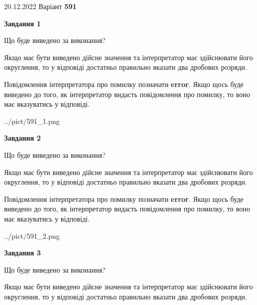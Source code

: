 \documentclass[12pt, ukrainian]{article}
\begin{document}
{20.12.2022 Варіант \No \textbf { 591 }\par}
{
\begin {Large}

{\begin {center}\textbf{Завдання 1}\end {center}}\par
Що буде виведено за виконання? \par

Якщо має бути виведено дійсне значення та інтерпретатор має здійснювати його округлення, 
то у відповіді достатньо правильно вказати два дробових розряди.

Повідомлення інтерпретатора про помилку позначати \textbf{error}.
Якщо щось буде виведено до того, як інтерпретатор видасть повідомлення про помилку, 
то воно має вказуватись у відповіді. \par

\begin{center}
	{../pict/591_1.png}
\end{center}
\newpage

{\begin {center}\textbf{Завдання 2}\end {center}}\par
Що буде виведено за виконання? \par

Якщо має бути виведено дійсне значення та інтерпретатор має здійснювати його округлення, 
то у відповіді достатньо правильно вказати два дробових розряди.

Повідомлення інтерпретатора про помилку позначати \textbf{error}.
Якщо щось буде виведено до того, як інтерпретатор видасть повідомлення про помилку, 
то воно має вказуватись у відповіді. \par

\begin{center}
	{../pict/591_2.png}
\end{center}
\newpage

{\begin {center}\textbf{Завдання 3}\end {center}}\par
Що буде виведено за виконання? \par

Якщо має бути виведено дійсне значення та інтерпретатор має здійснювати його округлення, 
то у відповіді достатньо правильно вказати два дробових розряди.


\end{Large}}
\end{document}
